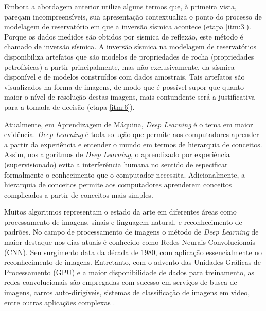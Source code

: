 Embora a abordagem anterior utilize alguns termos que, à primeira vista, pareçam incompreensíveis,
sua apresentação contextualiza o ponto do processo de modelagem de
reservatório em que a inversão sísmica acontece (etapa \ref{itm:3}).
Porque os dados medidos são obtidos por sísmica de reflexão,
este método é chamado de inversão sísmica. A inversão sísmica na
modelagem de reservatórios disponibiliza artefatos que são modelos de propriedades de rocha
(propriedades petrofísicas) a partir principalmente, mas não exclusivamente,
da sísmica disponível e de modelos construídos com dados amostrais. Tais artefatos
são visualizados na forma de imagens, de modo que é possível supor que quanto maior
o nível de resolução destas imagens, mais contundente será a justificativa para a tomada de decisão
(etapa \ref{itm:6}).

Atualmente, em Aprendizagem de Máquina, \textit{Deep Learning} é o tema em
maior evidência. \textit{Deep Learning} é toda solução que permite aos
computadores aprender a partir da experiência e entender o mundo em
termos de hierarquia de conceitos.
Assim, nos algoritmos de \textit{Deep Learning}, o aprendizado
por experiência (supervisionado) evita a interferência
humana no sentido de especificar formalmente o conhecimento que o computador necessita.
Adicionalmente, a hierarquia de conceitos permite aos computadores aprenderem
conceitos complicados a partir de conceitos mais simples\citep{Gdfl16}.

Muitos algoritmos representam
o estado da arte em diferentes áreas como processamento de imagens, 
sinais e linguagem natural, e reconhecimento de padrões. No campo de
processamento de imagens o método de \textit{Deep Learning} de
maior destaque nos dias atuais é conhecido
como Redes Neurais Convolucionais (CNN). Seu surgimento
data da década de 1980, com aplicação essencialmente no reconhecimento de imagens.
Entretanto, com o advento das Unidades Gráficas de Processamento (GPU) e a maior
disponibilidade de dados para treinamento, as redes convolucionais
são empregadas com sucesso em serviços de busca de imagens, carros auto-dirigíveis,
sistemas de classificação de imagens em video, entre outras aplicações complexas \citep[p. 50]{Buduma15}.

